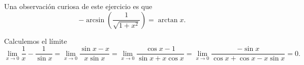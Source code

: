 \begin{observation}
\normalfont Una observación curiosa de este ejercicio es que
\[-\arcsin\left(\frac{1}{\sqrt{1 + x^{2}}}\right) = \arctan x .\]
\end{observation}
\begin{eg}
\normalfont Calculemos el límite
\[\lim_{x \to 0}\frac{1}{x}-\frac{1}{\sin x} = \lim_{x \to 0}\frac{\sin x - x}{x \sin x} = \lim_{x \to 0}\frac{\cos x - 1}{\sin x + x \cos x} = \lim_{x \to 0}\frac{-\sin x}{\cos x + \cos x - x \sin x} = 0 .\]
\end{eg}

